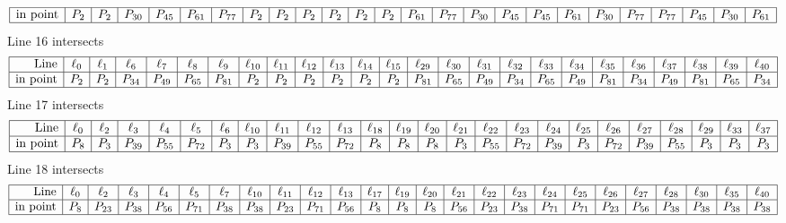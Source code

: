 \documentclass{article}
\begin{document}
{$$\begin{array}{|r*{24}{|c}|}
\hline
\mbox{in point}  & P_{2} & P_{2} & P_{30} & P_{45} & P_{61} & P_{77} & P_{2} & P_{2} & P_{2} & P_{2} & P_{2} & P_{2} & P_{61} & P_{77} & P_{30} & P_{45} & P_{45} & P_{61} & P_{30} & P_{77} & P_{77} & P_{45} & P_{30} & P_{61}\\
\hline
\end{array}
$$
Line 16 intersects 
$$
\begin{array}{|r*{24}{|c}|}
\hline
\mbox{Line}  & \ell_{0} & \ell_{1} & \ell_{6} & \ell_{7} & \ell_{8} & \ell_{9} & \ell_{10} & \ell_{11} & \ell_{12} & \ell_{13} & \ell_{14} & \ell_{15} & \ell_{29} & \ell_{30} & \ell_{31} & \ell_{32} & \ell_{33} & \ell_{34} & \ell_{35} & \ell_{36} & \ell_{37} & \ell_{38} & \ell_{39} & \ell_{40}\\
\hline
\mbox{in point}  & P_{2} & P_{2} & P_{34} & P_{49} & P_{65} & P_{81} & P_{2} & P_{2} & P_{2} & P_{2} & P_{2} & P_{2} & P_{81} & P_{65} & P_{49} & P_{34} & P_{65} & P_{49} & P_{81} & P_{34} & P_{49} & P_{81} & P_{65} & P_{34}\\
\hline
\end{array}
$$
Line 17 intersects 
$$
\begin{array}{|r*{24}{|c}|}
\hline
\mbox{Line}  & \ell_{0} & \ell_{2} & \ell_{3} & \ell_{4} & \ell_{5} & \ell_{6} & \ell_{10} & \ell_{11} & \ell_{12} & \ell_{13} & \ell_{18} & \ell_{19} & \ell_{20} & \ell_{21} & \ell_{22} & \ell_{23} & \ell_{24} & \ell_{25} & \ell_{26} & \ell_{27} & \ell_{28} & \ell_{29} & \ell_{33} & \ell_{37}\\
\hline
\mbox{in point}  & P_{8} & P_{3} & P_{39} & P_{55} & P_{72} & P_{3} & P_{3} & P_{39} & P_{55} & P_{72} & P_{8} & P_{8} & P_{8} & P_{3} & P_{55} & P_{72} & P_{39} & P_{3} & P_{72} & P_{39} & P_{55} & P_{3} & P_{3} & P_{3}\\
\hline
\end{array}
$$
Line 18 intersects 
$$
\begin{array}{|r*{24}{|c}|}
\hline
\mbox{Line}  & \ell_{0} & \ell_{2} & \ell_{3} & \ell_{4} & \ell_{5} & \ell_{7} & \ell_{10} & \ell_{11} & \ell_{12} & \ell_{13} & \ell_{17} & \ell_{19} & \ell_{20} & \ell_{21} & \ell_{22} & \ell_{23} & \ell_{24} & \ell_{25} & \ell_{26} & \ell_{27} & \ell_{28} & \ell_{30} & \ell_{35} & \ell_{40}\\
\hline
\mbox{in point}  & P_{8} & P_{23} & P_{38} & P_{56} & P_{71} & P_{38} & P_{38} & P_{23} & P_{71} & P_{56} & P_{8} & P_{8} & P_{8} & P_{56} & P_{23} & P_{38} & P_{71} & P_{71} & P_{23} & P_{56} & P_{38} & P_{38} & P_{38} & P_{38}\\
\hline
\end{array}
$$}
\end{document}
